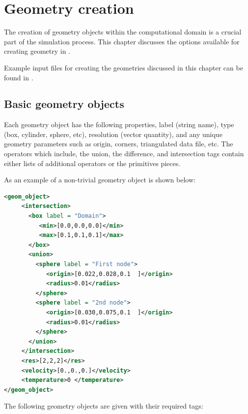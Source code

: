 \chapter{Geometry creation}\label{chap:GeometryCreation}
The creation of geometry objects within the computational domain is
a crucial part of the simulation process.  This chapter discusses the
options available for creating geometry in \Vaango.

\begin{NoteBox}
Example input files for creating the geometries discussed in this
chapter can be found in .
\end{NoteBox}

\section{Basic geometry objects} \label{Sec:GeometryObjects}

Each geometry object has the following properties, label (string
name), type (box, cylinder, sphere, etc), resolution (vector
quantity), and any unique geometry parameters such as origin, corners,
triangulated data file, etc.  The operators which include, the union,
the difference, and intersection tags contain either lists of
additional operators or the primitives pieces.

As an example of a non-trivial geometry object is shown below:

\begin{lstlisting}[language=XML]
<geom_object>
     <intersection>
       <box label = "Domain">
          <min>[0.0,0.0,0.0]</min>
          <max>[0.1,0.1,0.1]</max>
       </box>
       <union>
         <sphere label = "First node">
            <origin>[0.022,0.028,0.1  ]</origin>
            <radius>0.01</radius>
         </sphere>
         <sphere label = "2nd node">
            <origin>[0.030,0.075,0.1  ]</origin>
            <radius>0.01</radius>
         </sphere>
       </union>
     </intersection>
     <res>[2,2,2]</res>
     <velocity>[0.,0.,0.]</velocity>
     <temperature>0 </temperature>
</geom_object>
\end{lstlisting}

The following geometry objects are given with their required tags:

